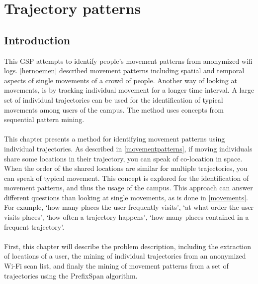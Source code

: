 \chapter{Trajectory patterns}\label{trajectories}
\section{Introduction}
This GSP attempts to identify people’s movement patterns from anonymized wifi logs. \autoref{hernoemen} described movement patterns including spatial and temporal aspects of single movements of a crowd of people. Another way of looking at movements, is by tracking individual movement for a longer time interval. A large set of individual trajectories can be used for the identification of typical movements among users of the campus. The method uses concepts from sequential pattern mining. \\\\
This chapter presents a method for identifying movement patterns using individual trajectories. As described in \autoref{movementpatterns}, if moving individuals share some locations in their trajectory, you can speak of co-location in space. When the order of the shared locations are similar for multiple trajectories, you can speak of typical movement. This concept is explored for the identification of movement patterns, and thus the usage of the campus. This approach can answer different questions than looking at single movements, as is done in \autoref{movements}. For example, ‘how many places the user frequently visits’, ‘at what order the user visits places’, ‘how often a trajectory happens’, ‘how many places contained in a frequent trajectory’.\\\\
First, this chapter will describe the problem description, including the extraction of locations of a user, the mining of individual trajectories from an anonymized Wi-Fi scan list, and finaly the mining of movement patterns from a set of trajectories using the PrefixSpan algorithm.
